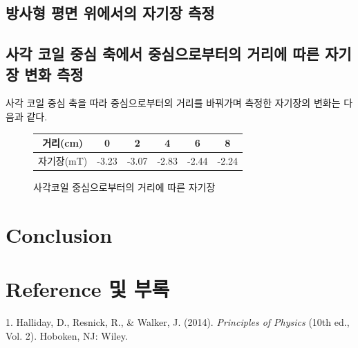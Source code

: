 \documentclass[a4paper]{article}
\begin{document}
	\subsection{방사형 평면 위에서의 자기장 측정}

	\subsection{사각 코일 중심 축에서 중심으로부터의 거리에 따른 자기장 변화 측정}
	사각 코일 중심 축을 따라 중심으로부터의 거리를 바꿔가며 측정한 자기장의 변화는 다음과 같다.
	\begin{figure}[h]
			\centering
			\begin{tabular}{c|ccccc}
				\hline \hline
				거리(\si{cm}) & 0 & 2 & 4 & 6 & 8 \\
				\hline
				자기장(\si{mT}) & -3.23 & -3.07 & -2.83 & -2.44 & -2.24 \\
				\hline \hline
			\end{tabular}
			\caption{사각코일 중심으로부터의 거리에 따른 자기장}
			\label{tab:sagakre}
	\end{figure}

\section{Conclusion}
	

	

\section{Reference 및 부록}
	1. Halliday, D., Resnick, R., \& Walker, J. (2014). {\it{}Principles of Physics} (10th ed., Vol. 2). Hoboken, NJ: Wiley.
	\\ 
\end{document}
